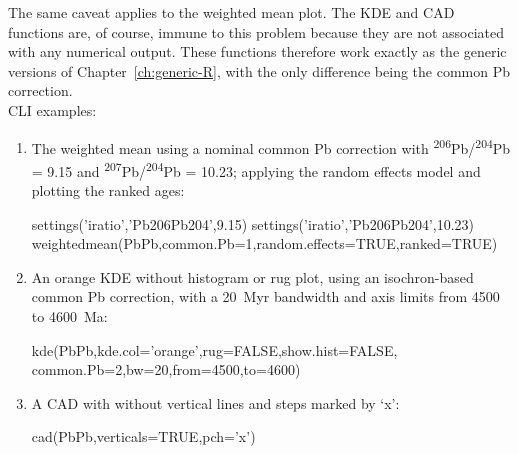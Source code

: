 \begin{refsection}
The same caveat applies to the weighted mean plot. The KDE and CAD
functions are, of course, immune to this problem because they are not
associated with any numerical output. These functions therefore work
exactly as the generic versions of Chapter~\ref{ch:generic-R}, with
the only difference being the common Pb correction.\\

\noindent CLI examples:

\begin{enumerate}

\item The weighted mean using a nominal common Pb correction with
  \textsuperscript{206}Pb/\textsuperscript{204}Pb = 9.15 and
  \textsuperscript{207}Pb/\textsuperscript{204}Pb = 10.23; applying
  the random effects model and plotting the ranked ages:
  
\begin{script}
settings('iratio','Pb206Pb204',9.15)
settings('iratio','Pb206Pb204',10.23)
weightedmean(PbPb,common.Pb=1,random.effects=TRUE,ranked=TRUE)
\end{script}

\item An orange KDE without histogram or rug plot, using an
  isochron-based common Pb correction, with a 20~Myr bandwidth and
  axis limits from 4500 to 4600~Ma:

\begin{console}
kde(PbPb,kde.col='orange',rug=FALSE,show.hist=FALSE,
    common.Pb=2,bw=20,from=4500,to=4600)
\end{console}

\item A CAD with without vertical lines and steps marked by `x':

\begin{console}
cad(PbPb,verticals=TRUE,pch='x')
\end{console}
  
\end{enumerate}

\printbibliography[heading=subbibliography]

\end{refsection}
